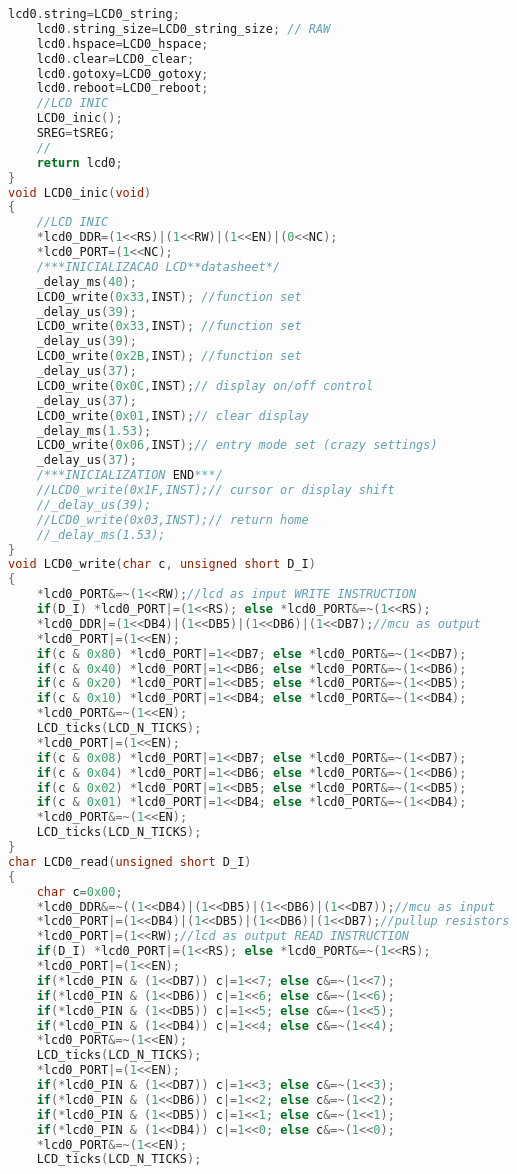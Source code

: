\begin{lstlisting}[language=C]
	lcd0.string=LCD0_string;
	lcd0.string_size=LCD0_string_size; // RAW
	lcd0.hspace=LCD0_hspace;
	lcd0.clear=LCD0_clear;
	lcd0.gotoxy=LCD0_gotoxy;
	lcd0.reboot=LCD0_reboot;
	//LCD INIC
	LCD0_inic();
	SREG=tSREG;
	//
	return lcd0;
}
void LCD0_inic(void)
{
	//LCD INIC
	*lcd0_DDR=(1<<RS)|(1<<RW)|(1<<EN)|(0<<NC);
	*lcd0_PORT=(1<<NC);
	/***INICIALIZACAO LCD**datasheet*/
	_delay_ms(40);
	LCD0_write(0x33,INST); //function set
	_delay_us(39);
	LCD0_write(0x33,INST); //function set
	_delay_us(39);
	LCD0_write(0x2B,INST); //function set
	_delay_us(37);
	LCD0_write(0x0C,INST);// display on/off control
	_delay_us(37);
	LCD0_write(0x01,INST);// clear display
	_delay_ms(1.53);
	LCD0_write(0x06,INST);// entry mode set (crazy settings)
	_delay_us(37);
	/***INICIALIZATION END***/
	//LCD0_write(0x1F,INST);// cursor or display shift
	//_delay_us(39);
	//LCD0_write(0x03,INST);// return home
	//_delay_ms(1.53);
}
void LCD0_write(char c, unsigned short D_I)
{
	*lcd0_PORT&=~(1<<RW);//lcd as input WRITE INSTRUCTION
	if(D_I) *lcd0_PORT|=(1<<RS); else *lcd0_PORT&=~(1<<RS);
	*lcd0_DDR|=(1<<DB4)|(1<<DB5)|(1<<DB6)|(1<<DB7);//mcu as output
	*lcd0_PORT|=(1<<EN);
	if(c & 0x80) *lcd0_PORT|=1<<DB7; else *lcd0_PORT&=~(1<<DB7);
	if(c & 0x40) *lcd0_PORT|=1<<DB6; else *lcd0_PORT&=~(1<<DB6);
	if(c & 0x20) *lcd0_PORT|=1<<DB5; else *lcd0_PORT&=~(1<<DB5);
	if(c & 0x10) *lcd0_PORT|=1<<DB4; else *lcd0_PORT&=~(1<<DB4);
	*lcd0_PORT&=~(1<<EN);
	LCD_ticks(LCD_N_TICKS);
	*lcd0_PORT|=(1<<EN);
	if(c & 0x08) *lcd0_PORT|=1<<DB7; else *lcd0_PORT&=~(1<<DB7);
	if(c & 0x04) *lcd0_PORT|=1<<DB6; else *lcd0_PORT&=~(1<<DB6);
	if(c & 0x02) *lcd0_PORT|=1<<DB5; else *lcd0_PORT&=~(1<<DB5);
	if(c & 0x01) *lcd0_PORT|=1<<DB4; else *lcd0_PORT&=~(1<<DB4);
	*lcd0_PORT&=~(1<<EN);
	LCD_ticks(LCD_N_TICKS);
}
char LCD0_read(unsigned short D_I)
{
	char c=0x00;
	*lcd0_DDR&=~((1<<DB4)|(1<<DB5)|(1<<DB6)|(1<<DB7));//mcu as input
	*lcd0_PORT|=(1<<DB4)|(1<<DB5)|(1<<DB6)|(1<<DB7);//pullup resistors
	*lcd0_PORT|=(1<<RW);//lcd as output READ INSTRUCTION
	if(D_I) *lcd0_PORT|=(1<<RS); else *lcd0_PORT&=~(1<<RS);
	*lcd0_PORT|=(1<<EN);
	if(*lcd0_PIN & (1<<DB7)) c|=1<<7; else c&=~(1<<7);
	if(*lcd0_PIN & (1<<DB6)) c|=1<<6; else c&=~(1<<6);
	if(*lcd0_PIN & (1<<DB5)) c|=1<<5; else c&=~(1<<5);
	if(*lcd0_PIN & (1<<DB4)) c|=1<<4; else c&=~(1<<4);
	*lcd0_PORT&=~(1<<EN);
	LCD_ticks(LCD_N_TICKS);
	*lcd0_PORT|=(1<<EN);
	if(*lcd0_PIN & (1<<DB7)) c|=1<<3; else c&=~(1<<3);
	if(*lcd0_PIN & (1<<DB6)) c|=1<<2; else c&=~(1<<2);
	if(*lcd0_PIN & (1<<DB5)) c|=1<<1; else c&=~(1<<1);
	if(*lcd0_PIN & (1<<DB4)) c|=1<<0; else c&=~(1<<0);
	*lcd0_PORT&=~(1<<EN);
	LCD_ticks(LCD_N_TICKS);

\end{lstlisting}
